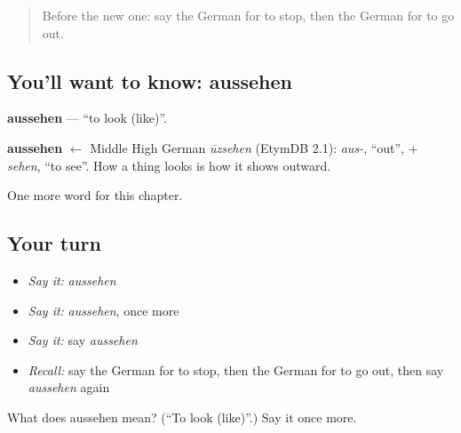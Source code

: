 \begin{quote}
Before the new one: say the German for to stop, then the German for to go out.
\end{quote}

\subsection*{You'll want to know: aussehen}
\textbf{aussehen} — \textquotedblleft{}to look (like)\textquotedblright{}.

\begin{cousinweb}
\textbf{aussehen} $\leftarrow$ Middle High German \emph{ūzsehen} (EtymDB 2.1): \emph{aus-}, \textquotedblleft{}out\textquotedblright{}, + \emph{sehen}, \textquotedblleft{}to see\textquotedblright{}. How a thing looks is how it shows outward.
\end{cousinweb}

\begin{grammarlens}[title={What you've built}]
One more word for this chapter.
\end{grammarlens}

\subsection*{Your turn}
\begin{itemize}
\raggedright
  \item \emph{Say it:} \emph{aussehen}
  \item \emph{Say it:} \emph{aussehen}, once more
  \item \emph{Say it:} say \emph{aussehen}
  \item \emph{Recall:} say the German for to stop, then the German for to go out, then say \emph{aussehen} again
\end{itemize}

\begin{tcolorbox}[breakable,colback=teal!4,colframe=teal!35!black,title={Before you move on}]
What does aussehen mean? (\textquotedblleft{}To look (like)\textquotedblright{}.) Say it once more.
\end{tcolorbox}
